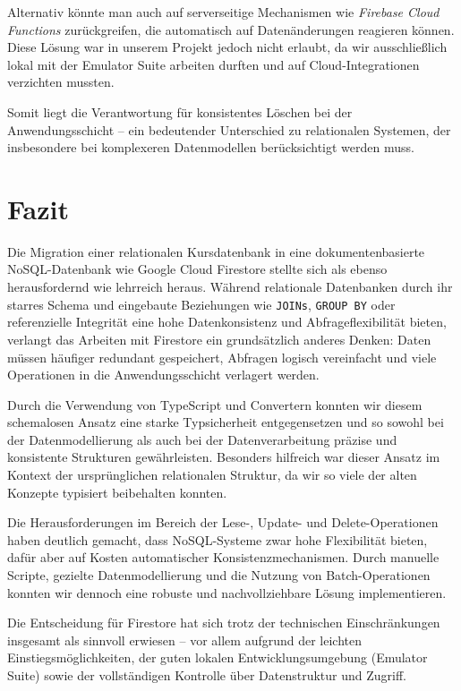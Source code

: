 \documentclass[12pt,a4paper%
              ,oneside     %
              ,titlepage
              ,DIV=13
              ,headinclude
              ,footinclude=false%
              ,cleardoublepage=empty%
              ,parskip=half,
              BCOR=0mm,
              ]{scrreprt}
\begin{document}
Alternativ könnte man auch auf serverseitige Mechanismen wie \textit{Firebase Cloud Functions} zurückgreifen, die automatisch auf Datenänderungen reagieren können. Diese Lösung war in unserem Projekt jedoch nicht erlaubt, da wir ausschließlich lokal mit der Emulator Suite arbeiten durften und auf Cloud-Integrationen verzichten mussten.

Somit liegt die Verantwortung für konsistentes Löschen bei der Anwendungsschicht – ein bedeutender Unterschied zu relationalen Systemen, der insbesondere bei komplexeren Datenmodellen berücksichtigt werden muss.

\chapter{Fazit}

Die Migration einer relationalen Kursdatenbank in eine dokumentenbasierte NoSQL-Datenbank wie Google Cloud Firestore stellte sich als ebenso herausfordernd wie lehrreich heraus. Während relationale Datenbanken durch ihr starres Schema und eingebaute Beziehungen wie \texttt{JOINs}, \texttt{GROUP BY} oder referenzielle Integrität eine hohe Datenkonsistenz und Abfrageflexibilität bieten, verlangt das Arbeiten mit Firestore ein grundsätzlich anderes Denken: Daten müssen häufiger redundant gespeichert, Abfragen logisch vereinfacht und viele Operationen in die Anwendungsschicht verlagert werden.

Durch die Verwendung von TypeScript und Convertern konnten wir diesem schemalosen Ansatz eine starke Typsicherheit entgegensetzen und so sowohl bei der Datenmodellierung als auch bei der Datenverarbeitung präzise und konsistente Strukturen gewährleisten. Besonders hilfreich war dieser Ansatz im Kontext der ursprünglichen relationalen Struktur, da wir so viele der alten Konzepte typisiert beibehalten konnten.

Die Herausforderungen im Bereich der Lese-, Update- und Delete-Operationen haben deutlich gemacht, dass NoSQL-Systeme zwar hohe Flexibilität bieten, dafür aber auf Kosten automatischer Konsistenzmechanismen. Durch manuelle Scripte, gezielte Datenmodellierung und die Nutzung von Batch-Operationen konnten wir dennoch eine robuste und nachvollziehbare Lösung implementieren.

Die Entscheidung für Firestore hat sich trotz der technischen Einschränkungen insgesamt als sinnvoll erwiesen – vor allem aufgrund der leichten Einstiegsmöglichkeiten, der guten lokalen Entwicklungsumgebung (Emulator Suite) sowie der vollständigen Kontrolle über Datenstruktur und Zugriff.
\end{document}
